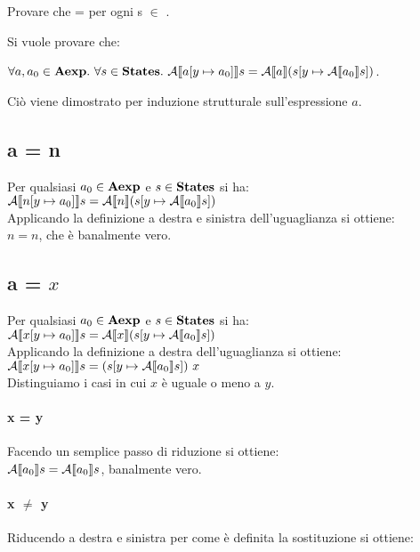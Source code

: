 {
	Provare che
	 =
	 per ogni s $\in$
	\states.
}
{
Si vuole provare che:

$\forall{a,a_0} \in \textbf{Aexp}.\mbox{ }
\forall{s} \in \textbf{States}.\mbox{ }
\mathcal{A} \llbracket a [y \mapsto{} a_0] \rrbracket s =
\mathcal{A} \llbracket a \rrbracket (s [y \mapsto{} \mathcal{A} \llbracket a_0 \rrbracket s])$.

Ciò viene dimostrato per induzione strutturale sull'espressione $a$.

\subsection{a = n} Per qualsiasi $a_0 \in \textbf{Aexp}$ e $s \in \textbf{States}$ si ha:
\\

$\mathcal{A} \llbracket n [y \mapsto{} a_0] \rrbracket s = \mathcal{A} \llbracket n \rrbracket (s [y \mapsto{} \mathcal{A} \llbracket a_0 \rrbracket s]) $
\\

Applicando la definizione  a destra e sinistra dell'uguaglianza si ottiene:
\\

$n = n$, che è banalmente vero.

\subsection{a = $x$} Per qualsiasi $a_0 \in \textbf{Aexp}$ e $s \in \textbf{States}$ si ha:
\\

$\mathcal{A} \llbracket x [y \mapsto{} a_0] \rrbracket s = \mathcal{A} \llbracket x \rrbracket (s [y \mapsto{} \mathcal{A} \llbracket a_0 \rrbracket s]) $
\\

Applicando la definizione  a destra dell'uguaglianza si ottiene:
\\

$\mathcal{A} \llbracket x [y \mapsto{} a_0] \rrbracket s = (s [y \mapsto{} \mathcal{A} \llbracket a_0 \rrbracket s]) \mbox{ } x $
\\

Distinguiamo i casi in cui $x$ è uguale o meno a $y$.

\paragraph{x = y} Facendo un semplice passo di riduzione si ottiene:
\\

$\mathcal{A} \llbracket a_0 \rrbracket s = \mathcal{A} \llbracket a_0 \rrbracket s$,
banalmente vero.

\paragraph{x $\neq$ y} Riducendo a destra e sinistra per come è definita la
sostituzione si ottiene:
\\

}
